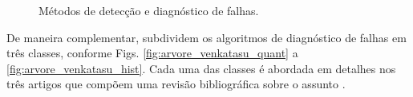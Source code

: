 \begin{figure}[htb]
\centering
    \caption{Métodos de detecção e diagnóstico de falhas.}
    \label{fig:arvores_isermann}
\end{figure}

De maneira complementar,  subdividem os algoritmos
de diagnóstico de falhas em três classes, conforme Figs.
\ref{fig:arvore_venkatasu_quant} a \ref{fig:arvore_venkatasu_hist}. Cada uma das
classes é abordada em detalhes nos três artigos que compõem uma revisão
bibliográfica sobre o assunto
\cite{venkatasu:2003a,venkatasu:2003b,venkatasu:2003c}.

